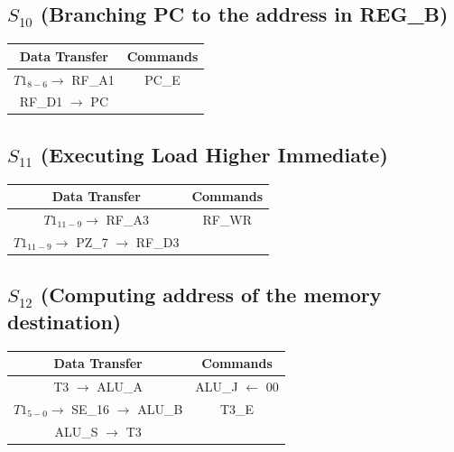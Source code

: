 \documentclass[]{report}
\begin{document}
        \subsection*{$S_{10}$ (Branching PC to the address in REG\_B)} %
        \begin{center}
            \begin{tabular}{|c|c|}
                \hline
                Data Transfer & Commands \\
                \hline
                $T1_{8-6} \to$ RF\_A1 & PC\_E\\
                RF\_D1 $\to$ PC & \\
                \hline
            \end{tabular}
        \end{center}
        \subsection*{$S_{11}$ (Executing Load Higher Immediate)} %
        \begin{center}
            \begin{tabular}{|c|c|}
                \hline
                Data Transfer & Commands \\
                \hline
                $T1_{11-9} \to$ RF\_A3 & RF\_WR\\
                $T1_{11-9} \to$ PZ\_7 $\to$ RF\_D3 & \\   %
                \hline
            \end{tabular}
        \end{center}

        \subsection*{$S_{12}$ (Computing address of the memory destination)} %
        \begin{center}
            \begin{tabular}{|c|c|}
                \hline
                Data Transfer & Commands \\
                \hline
                T3 $\to$ ALU\_A & ALU\_J $\leftarrow$ 00\\
                $T1_{5-0} \to$ SE\_16 $\to$ ALU\_B & T3\_E\\
                ALU\_S $\to$ T3 & \\
                \hline
            \end{tabular}
        \end{center}
\end{document}
